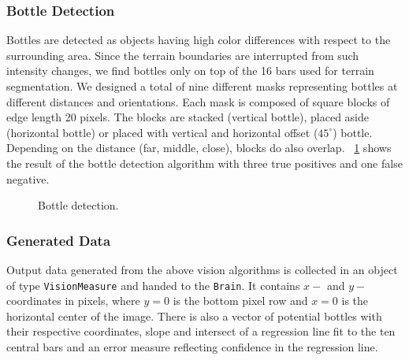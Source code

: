 \subsubsection{Bottle Detection}
Bottles are detected as objects having high color differences with respect to the surrounding
area. Since the terrain boundaries are interrupted from such intensity changes, we find
bottles only on top of the 16 bars used for terrain segmentation. We designed a total of
nine different masks representing bottles at different distances and orientations.
Each mask is composed of square blocks of edge length 20 pixels. The blocks are stacked
(vertical bottle), placed aside (horizontal bottle) or placed with vertical and horizontal
offset ($45^\circ$) bottle. Depending on the distance (far, middle, close), blocks
do also overlap. \figurename~\ref{fig:bottles1} shows the result of the bottle detection
algorithm with three true positives and one false negative.

\begin{figure}
\center
{}
\hfill
{}
\label{fig:bottles1}
\caption{Bottle detection.}
\end{figure}


\subsubsection{Generated Data}
Output data generated from the above vision algorithms is collected in an object of type
\texttt{VisionMeasure} and handed to the \texttt{Brain}. It contains $x-$ and $y-$coordinates
in pixels, where $y=0$ is the bottom pixel row and $x=0$ is the horizontal center of the
image. There is also a vector of potential bottles with their respective coordinates,
slope and intersect of a regression line fit to the ten central bars and an error measure
reflecting confidence in the regression line.

